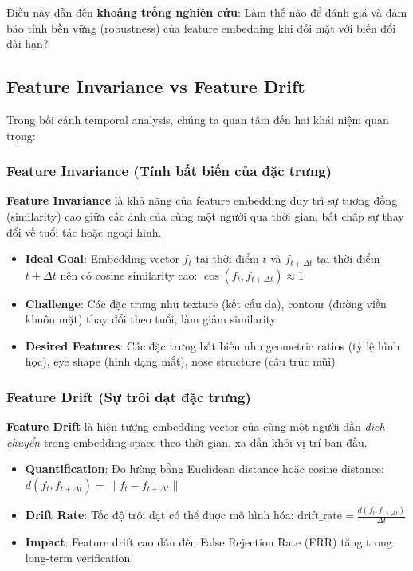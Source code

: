 Điều này dẫn đến \textbf{khoảng trống nghiên cứu}: Làm thế nào để đánh giá và đảm bảo tính bền vững (robustness) của feature embedding khi đối mặt với biến đổi dài hạn?

\subsection{Feature Invariance vs Feature Drift}

Trong bối cảnh temporal analysis, chúng ta quan tâm đến hai khái niệm quan trọng:

\subsubsection{Feature Invariance (Tính bất biến của đặc trưng)}

\textbf{Feature Invariance} là khả năng của feature embedding duy trì sự tương đồng (similarity) cao giữa các ảnh của cùng một người qua thời gian, bất chấp sự thay đổi về tuổi tác hoặc ngoại hình.

\begin{itemize}
    \item \textbf{Ideal Goal}: Embedding vector $f_t$ tại thời điểm $t$ và $f_{t+\Delta t}$ tại thời điểm $t+\Delta t$ nên có cosine similarity cao: $\cos(f_t, f_{t+\Delta t}) \approx 1$
    \item \textbf{Challenge}: Các đặc trưng như texture (kết cấu da), contour (đường viền khuôn mặt) thay đổi theo tuổi, làm giảm similarity
    \item \textbf{Desired Features}: Các đặc trưng bất biến như geometric ratios (tỷ lệ hình học), eye shape (hình dạng mắt), nose structure (cấu trúc mũi)
\end{itemize}

\subsubsection{Feature Drift (Sự trôi dạt đặc trưng)}

\textbf{Feature Drift} là hiện tượng embedding vector của cùng một người dần \textit{dịch chuyển} trong embedding space theo thời gian, xa dần khỏi vị trí ban đầu.

\begin{itemize}
    \item \textbf{Quantification}: Đo lường bằng Euclidean distance hoặc cosine distance: $d(f_t, f_{t+\Delta t}) = \|f_t - f_{t+\Delta t}\|$
    \item \textbf{Drift Rate}: Tốc độ trôi dạt có thể được mô hình hóa: $\text{drift\_rate} = \frac{d(f_t, f_{t+\Delta t})}{\Delta t}$
    \item \textbf{Impact}: Feature drift cao dẫn đến False Rejection Rate (FRR) tăng trong long-term verification
\end{itemize}

